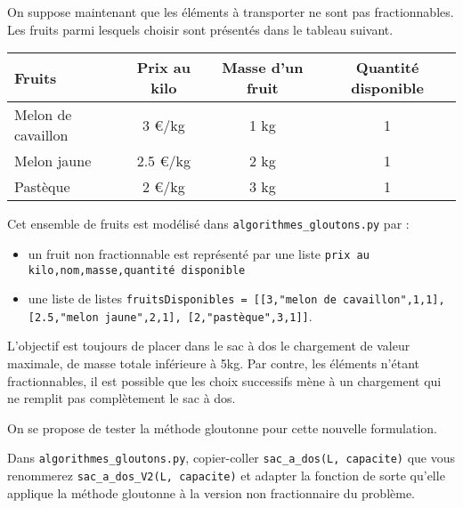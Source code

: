 On suppose maintenant que les éléments à transporter ne sont pas fractionnables. Les fruits parmi lesquels choisir sont présentés dans le tableau suivant.


\begin{table}[h]
\centering
\begin{tabular}{lccc}
\hline
\textbf{Fruits} & \textbf{Prix au kilo} & \textbf{Masse d’un fruit} & \textbf{Quantité disponible}\\
\hline
Melon de cavaillon & 3 €/kg & 1 kg & 1\\
Melon jaune  & 2.5 €/kg & 2 kg & 1\\
Pastèque & 2 €/kg & 3 kg & 1 \\
\hline
\end{tabular}
\label{tab_fruit2}
\end{table}

Cet ensemble de fruits est modélisé dans \lstinline{algorithmes_gloutons.py} par :
\begin{itemize}
\item un fruit non fractionnable est représenté par une liste \lstinline{prix au kilo,nom,masse,quantité disponible}
\item une liste de listes \lstinline{fruitsDisponibles = [[3,"melon de cavaillon",1,1], [2.5,"melon jaune",2,1], [2,"pastèque",3,1]]}.
\end{itemize}



L’objectif est toujours de placer dans le sac à dos le chargement de valeur maximale, de masse totale inférieure à 5kg. Par contre, les éléments n’étant fractionnables, il est possible que les choix successifs mène à un chargement qui ne remplit pas complètement le sac à dos.

On se propose de tester la méthode gloutonne pour cette nouvelle formulation. 

 

\begin{question}
Dans \lstinline{algorithmes_gloutons.py}, copier-coller \lstinline{sac_a_dos(L, capacite)} que vous renommerez \lstinline{sac_a_dos_V2(L, capacite)} et adapter la fonction de sorte qu’elle applique la méthode gloutonne à la version non fractionnaire du problème. %


\end{question}

